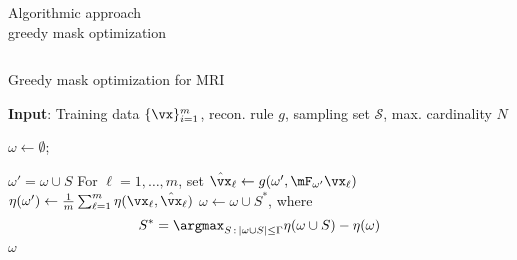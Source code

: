 \begin{frame}{Algorithmic approach\\[-3mm] {\normalsize greedy mask optimization}}

\begin{columns}[T]
\vspace{-.6cm}
\begin{algorithm}[H] 
\caption{Greedy mask optimization for MRI\\ \parencite{gozcu2018learning}}
\label{alg:g1}
{\footnotesize \textbf{Input}: Training data $\{\vx\}_{i=1}^m$, recon. rule $g$, sampling set $\mathcal{S}$, max. cardinality $N$}%
\begin{algorithmic}[1]
\State $\omega \leftarrow \emptyset$;
\While{$ |\omega| \leq  \Gamma$}

        \State $\omega' = \omega \cup S$
   	 \State For $\ell = 1,\ldots,m$, set ${\hat{\vx}}_\ell\leftarrow g(\omega', \mF_{\omega'} \vx_\ell)$
        \State   $\eta(\omega') \leftarrow \frac{1}{m} \sum_{\ell=1}^m \eta(\vx_\ell, {\hat{\vx}}_\ell)$
    \EndFor
    \State $\omega \leftarrow \omega \cup S^*$, where %
    \vspace{-3mm}
    \begin{equation*}
        S^* = \argmax_{S\,:\,|\omega \cup S| \le \Gamma}  \eta(\omega \cup S) - \eta(\omega)%
    \end{equation*}\vspace{-5mm}
 \EndWhile
  $\omega$
\end{algorithmic}
\end{algorithm}


\end{columns}
\end{frame}
